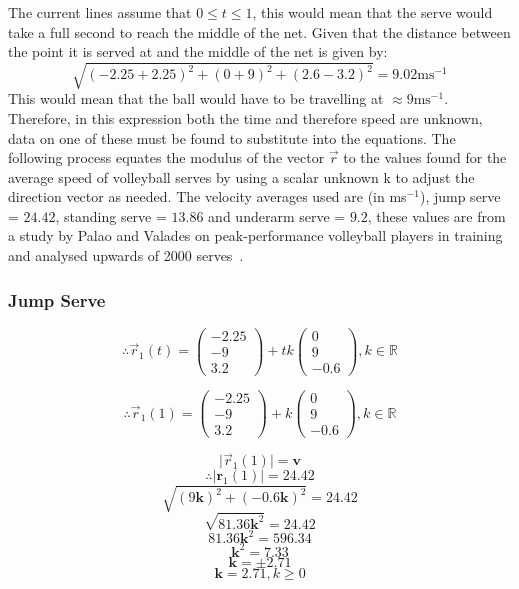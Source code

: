\documentclass{article}
\begin{document}
					The current lines assume that \( 0 \le t \le 1 \), this would mean that the serve would take a full second to reach the middle of the net. Given that the distance between the point it is served at and the middle of the net is given by:
					\[\sqrt{(-2.25+2.25)^{2}+(0+9)^{2}+(2.6-3.2)^{2}} = 9.02\text{ms}^{-1}\]
					This would mean that the ball would have to be travelling at \( \approx 9 \text{ms}^{-1}\). Therefore, in this expression both the time and therefore speed are unknown, data on one of these must be found to substitute into the equations. The following process equates the modulus of the vector \(\vec{r}\) to the values found for the average speed of volleyball serves by using a scalar unknown \(\mathrm{k}\) to adjust the direction vector as needed. The velocity averages used are (in ms\(^{-1}\)), jump serve = \(24.42\), standing serve = \(13.86\) and underarm serve = \(9.2\), these values are from a study by Palao and Valades on peak-performance volleyball players in training and analysed upwards of 2000 serves~\cite{servespeed}.

					\subsubsection*{Jump Serve}

					\[\therefore \vec{r}_1(t) = 
						\begin{pmatrix} -2.25 \\ -9 \\ 3.2 \end{pmatrix} 
						+ tk \begin{pmatrix} 0 \\ 9 \\ -0.6 \end{pmatrix}, k \in \mathbb{R}\]

						\[\therefore \vec{r}_1(1) = 
							\begin{pmatrix} -2.25 \\ -9 \\ 3.2 \end{pmatrix} 
							+ k \begin{pmatrix} 0 \\ 9 \\ -0.6 \end{pmatrix}, k \in \mathbb{R}\]

							\[\lvert \vec{r}_{1}(1) \rvert = \mathbf{v}\]
							\[\therefore \lvert \mathbf{r}_{1}(1) \rvert= 24.42\]
							\[\sqrt{(9\mathbf{k})^{2} + (-0.6\mathbf{k})^{2}} = 24.42\]
							\[\sqrt{81.36\mathbf{k}^{2}} = 24.42\]
							\[81.36\mathbf{k}^{2} = 596.34\]
							\[\mathbf{k}^{2} = 7.33\]
							\[\mathbf{k} = \pm2.71\]
							\[\mathbf{k} = 2.71, k \geq 0\]
\end{document}
